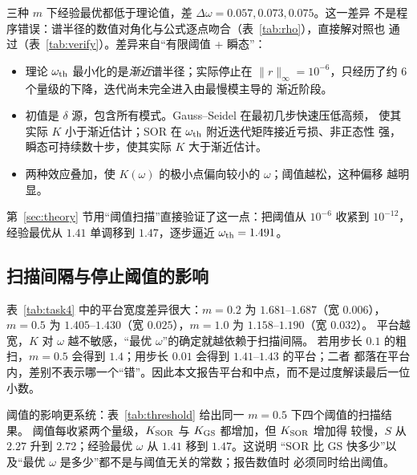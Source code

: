 \documentclass[UTF8,fontset=windows,a4paper,11pt]{ctexart}
\begin{document}
三种 $m$ 下经验最优都低于理论值，差 $\Delta\omega=0.057,0.073,0.075$。这一差异
不是程序错误：谱半径的数值对角化与公式逐点吻合（表~\ref{tab:rho}），直接解对照也
通过（表~\ref{tab:verify}）。差异来自“有限阈值 + 瞬态”：
\begin{itemize}[leftmargin=2.1em,itemsep=0.15em,topsep=0.2em]
\item 理论 $\omega_{\rm th}$ 最小化的是\emph{渐近}谱半径；实际停止在
$\|r\|_\infty=10^{-6}$，只经历了约 6 个量级的下降，迭代尚未完全进入由最慢模主导的
渐近阶段。
\item 初值是 $\delta$ 源，包含所有模式。Gauss--Seidel 在最初几步快速压低高频，
使其实际 $K$ 小于渐近估计；SOR 在 $\omega_{\rm th}$ 附近迭代矩阵接近亏损、非正态性
强，瞬态可持续数十步，使其实际 $K$ 大于渐近估计。
\item 两种效应叠加，使 $K(\omega)$ 的极小点偏向较小的 $\omega$；阈值越松，这种偏移
越明显。
\end{itemize}
第~\ref{sec:theory} 节用“阈值扫描”直接验证了这一点：把阈值从 $10^{-6}$ 收紧到
$10^{-12}$，经验最优从 $1.41$ 单调移到 $1.47$，逐步逼近 $\omega_{\rm th}=1.491$。

\subsection{扫描间隔与停止阈值的影响}

表~\ref{tab:task4} 中的平台宽度差异很大：$m=0.2$ 为 $1.681$--$1.687$（宽 $0.006$），
$m=0.5$ 为 $1.405$--$1.430$（宽 $0.025$），$m=1.0$ 为 $1.158$--$1.190$（宽 $0.032$）。
平台越宽，$K$ 对 $\omega$ 越不敏感，“最优 $\omega$”的确定就越依赖于扫描间隔。
若用步长 $0.1$ 的粗扫，$m=0.5$ 会得到 $1.4$；用步长 $0.01$ 会得到 $1.41$--$1.43$ 的平台；二者
都落在平台内，差别不表示哪一个“错”。因此本文报告平台和中点，而不是过度解读最后一位
小数。

阈值的影响更系统：表~\ref{tab:threshold} 给出同一 $m=0.5$ 下四个阈值的扫描结果。
阈值每收紧两个量级，$K_{\rm SOR}$ 与 $K_{\rm GS}$ 都增加，但 $K_{\rm SOR}$ 增加得
较慢，$S$ 从 $2.27$ 升到 $2.72$；经验最优 $\omega$ 从 $1.41$ 移到 $1.47$。这说明
“SOR 比 GS 快多少”以及“最优 $\omega$ 是多少”都不是与阈值无关的常数；报告数值时
必须同时给出阈值。

\begin{table}[htbp]
\centering
\caption{$N=63$、$m=0.5$ 时停止阈值对经验最优 $\omega$ 与迭代次数比的影响。
每个阈值下都在 $\omega=1.30$--$1.55$ 内以步长 $0.01$ 扫描。}
\label{tab:threshold}
\small

\end{table}
\end{document}
